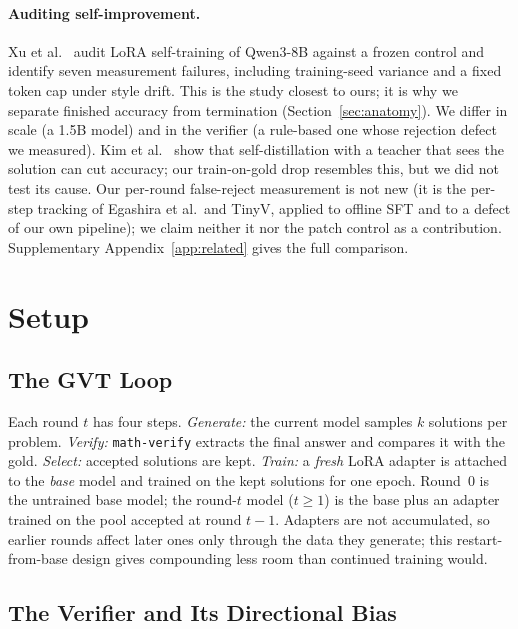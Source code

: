 \documentclass[runningheads]{llncs}
\begin{document}
\paragraph{Auditing self-improvement.}
Xu et al.~\cite{ref_phantom} audit LoRA self-training of Qwen3-8B against a
frozen control and identify seven measurement failures, including training-seed
variance and a fixed token cap under style drift. This is the study closest to ours; it is why we separate
finished accuracy from termination (Section~\ref{sec:anatomy}). We differ in
scale (a 1.5B model) and in the verifier (a rule-based one whose rejection defect we
measured). Kim et
al.~\cite{ref_selfdistill} show that self-distillation with a teacher that sees the
solution can cut accuracy; our train-on-gold drop resembles this, but we did not test its cause. Our per-round false-reject measurement
is not new (it is the per-step tracking of
Egashira et al.\ and TinyV, applied to offline SFT and to a defect of our own
pipeline); we claim neither it nor the patch control as a contribution. Supplementary Appendix~\ref{app:related} gives the full comparison.

\section{Setup}
\label{sec:setup}

\subsection{The GVT Loop}
\label{sec:loop}

Each round $t$ has four steps. \emph{Generate:} the current model samples $k$
solutions per problem. \emph{Verify:} \texttt{math-verify} extracts the final
answer and compares it with the gold. \emph{Select:} accepted solutions are kept.
\emph{Train:} a \emph{fresh} LoRA adapter is attached to the \emph{base} model and
trained on the kept solutions for one epoch. Round~0 is the untrained base model;
the round-$t$ model ($t\ge1$) is the base plus an adapter trained on the pool
accepted at round $t-1$. Adapters are not accumulated, so earlier rounds affect
later ones only through the data they generate; this restart-from-base design gives
compounding less room than continued training would.

\subsection{The Verifier and Its Directional Bias}
\label{sec:verifier}
\end{document}

